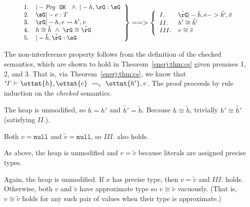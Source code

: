\begin{theorem}
\label{enerj:thm:ni}
\[
\small
\left.
\begin{array}{ll}
1. & |- \mathit{Prg}\ \ \mathtt{OK} \ \ \wedge\  |- h, \rG : \sG\\
2. & \sG |- e : T\\
3. & \rG |- h, e \leadsto h', v\\
4. & h \cong \tilde{h}  \ \wedge\  \rG \cong \tilde{\rG}\\
5. & |- \tilde{h}, \tilde{\rG} : \sG\\
\end{array}
\right\}
==>
\left\{
\begin{array}{ll}
I. & \tilde{\rG} |- \tilde{h}, e -> \tilde{h'}, \tilde{v}\\
II. & h' \cong \tilde{h'}\\
III. & v \cong \tilde{v}
\end{array}
\right.
\]
\end{theorem}

The non-interference property follows from the definition of the checked
semantics, which are shown to hold in Theorem~\ref{enerj:thm:cs} given premises 1, 2,
and 3. That
is, via Theorem~\ref{enerj:thm:cs}, we know that 
$ \mathit{ {^r}\!\Gamma} \  \textsf{$\vdash$} \  \ottnt{h} ,  \ottnt{e} \ \leadsto_{c}\  \ottnt{h'} ,  v $. The proof proceeds by rule induction on the
\emph{checked} semantics.


The heap is unmodified, so $h = h'$ and $\tilde{h'} = \tilde{h}$. Because
$h \cong \tilde{h}$, trivially $h' \cong \tilde{h'}$ (satisfying $II.$).

Both $v = \mathtt{null}$ and $\tilde{v} = \mathtt{null}$, so $III.$ also holds.


As above, the heap is unmodified and $v = \tilde{v}$ because literals are
assigned precise types.


Again, the heap is unmodified. If $x$ has precise type, then $v = \tilde{v}$ and
$III.$ holds. Otherwise, both $v$ and $\tilde{v}$ have approximate type so
$v \cong \tilde{v}$ vacuously. (That is, $v \cong \tilde{v}$ holds for any such
pair of values when their type is approximate.)


